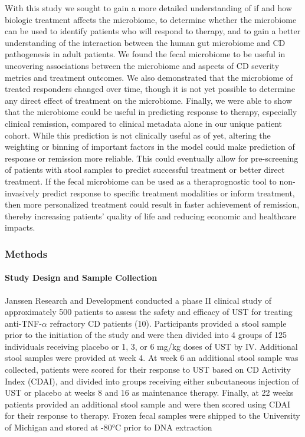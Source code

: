 \documentclass[11pt,]{article}
\let\oldparagraph\paragraph
\renewcommand{\paragraph}[1]{\oldparagraph{#1}\mbox{}}
\begin{document}
With this study we sought to gain a more detailed understanding of if
and how biologic treatment affects the microbiome, to determine whether
the microbiome can be used to identify patients who will respond to
therapy, and to gain a better understanding of the interaction between
the human gut microbiome and CD pathogenesis in adult patients. We found
the fecal microbiome to be useful in uncovering associations between the
microbiome and aspects of CD severity metrics and treatment outcomes. We
also demonstrated that the microbiome of treated responders changed over
time, though it is not yet possible to determine any direct effect of
treatment on the microbiome. Finally, we were able to show that the
microbiome could be useful in predicting response to therapy, especially
clinical remission, compared to clinical metadata alone in our unique
patient cohort. While this prediction is not clinically useful as of
yet, altering the weighting or binning of important factors in the model
could make prediction of response or remission more reliable. This could
eventually allow for pre-screening of patients with stool samples to
predict successful treatment or better direct treatment. If the fecal
microbiome can be used as a theraprognostic tool to non-invasively
predict response to specific treatment modalities or inform treatment,
then more personalized treatment could result in faster achievement of
remission, thereby increasing patients' quality of life and reducing
economic and healthcare impacts.

\newpage

\subsubsection{Methods}\label{methods}

\paragraph{Study Design and Sample
Collection}\label{study-design-and-sample-collection}

Janssen Research and Development conducted a phase II clinical study of
approximately 500 patients to assess the safety and efficacy of UST for
treating anti-TNF-\({\alpha}\) refractory CD patients (10). Participants
provided a stool sample prior to the initiation of the study and were
then divided into 4 groups of 125 individuals receiving placebo or 1, 3,
or 6 mg/kg doses of UST by IV. Additional stool samples were provided at
week 4. At week 6 an additional stool sample was collected, patients
were scored for their response to UST based on CD Activity Index (CDAI),
and divided into groups receiving either subcutaneous injection of UST
or placebo at weeks 8 and 16 as maintenance therapy. Finally, at 22
weeks patients provided an additional stool sample and were then scored
using CDAI for their response to therapy. Frozen fecal samples were
shipped to the University of Michigan and stored at -80°C prior to DNA
extraction
\end{document}
